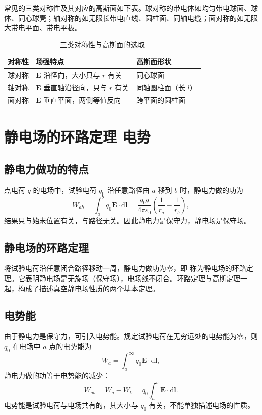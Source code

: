     常见的三类对称性及其对应的高斯面如下表。球对称的带电体如均匀带电球面、球体、同心球壳；轴对称的如无限长带电直线、圆柱面、同轴电缆；面对称的如无限大带电平面、带电平板。

    \begin{table}[htbp]
    \centering
    \caption{三类对称性与高斯面的选取}
    \begin{tabular}{lll}
    \toprule
    对称性 & 场强特点 & 高斯面形状 \\
    \midrule
    球对称 & $\boldsymbol{E}$ 沿径向，大小只与 $r$ 有关 & 同心球面 \\
    轴对称 & $\boldsymbol{E}$ 垂直轴沿径向，只与 $r$ 有关 & 同轴圆柱面（长 $l$） \\
    面对称 & $\boldsymbol{E}$ 垂直平面，两侧等值反向 & 跨平面的圆柱面 \\
    \bottomrule
    \end{tabular}
    \end{table}


\section{静电场的环路定理 电势}
    \subsection{静电力做功的特点}
    点电荷 $q$ 的电场中，试验电荷 $q_0$ 沿任意路径由 $a$ 移到 $b$ 时，静电力做的功为
    \[
    W_{ab}=\int_a^b q_0\boldsymbol{E}\cdot\mathrm{d}\boldsymbol{l}
    =\frac{q_0q}{4\pi\varepsilon_0}\left(\frac{1}{r_a}-\frac{1}{r_b}\right),
    \]
    结果只与始末位置有关，与路径无关。因此静电力是保守力，静电场是保守场。

    \subsection{静电场的环路定理}
    将试验电荷沿任意闭合路径移动一周，静电力做功为零，即
    称为静电场的环路定理。它表明静电场是无旋场（保守场），电场线不闭合。环路定理与高斯定理一起，构成了描述真空静电场性质的两个基本定理。

    \subsection{电势能}
    由于静电力是保守力，可引入电势能。规定试验电荷在无穷远处的电势能为零，则 $q_0$ 在电场中 $a$ 点的电势能为
    \[
    W_a=\int_a^{\infty}q_0\boldsymbol{E}\cdot\mathrm{d}\boldsymbol{l},
    \]
    静电力做的功等于电势能的减少：
    \[
    W_{ab}=W_a-W_b=q_0\int_a^b\boldsymbol{E}\cdot\mathrm{d}\boldsymbol{l}.
    \]
    电势能是试验电荷与电场共有的，其大小与 $q_0$ 有关，不能单独描述电场的性质。

